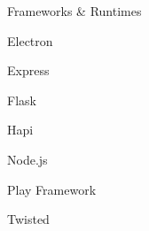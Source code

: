 \begin{skillset}{Frameworks \& Runtimes}
  \item Electron
  \item Express
  \item Flask
  \item Hapi
  \item Node.js
  \item Play Framework
  \item Twisted
\end{skillset}
